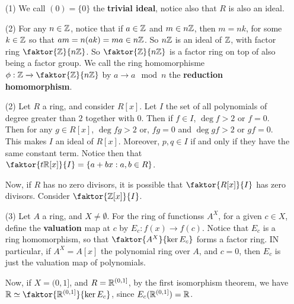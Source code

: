\begin{example}\label{1.10}
    \begin{enumerate}
        \item[(1)] We call $(0)=\{0\}$ the \textbf{trivial ideal}, notice also
            that $R$ is also an ideal.

        \item[(2)] For any $n \in \mathbb{Z}$, notice that if $a \in \mathbb{Z}$ and $m \in
            n\mathbb{Z}$, then  $m=nk$, for some  $k \in \mathbb{Z}$ so that  $am=n(ak)=ma \in
            n\mathbb{Z}$. So $n\mathbb{Z}$ is an ideal of $\mathbb{Z}$, with factor ring
            $\faktor{\Z}{n\Z}$. So $\faktor{\Z}{n\Z}$ is a factor ring on top of
            also being a factor group. We call the ring homomorphisme $\phi:\Z
        \xrightarrow{} \faktor{\Z}{n\Z}$ by $a \xrightarrow{} a \mod{n}$ the
        \textbf{reduction homomorphism}.

        \item[(2)] Let $R$ a ring, and consider  $R[x]$. Let $I$ the set of all
            polynomials of degree greater than $2$ together with $0$. Then if
            $f \in I$,  $\deg{f}>2$ or $f=0$. Then for any  $g \in R[x]$,
            $\deg{fg}>2$ or, $fg=0$ and $\deg{gf}>2$ or $gf=0$. This makes  $I$
            an ideal of $R[x]$. Moreover, $p,q \in I$ if and only if they have
            the same constant term. Notice then that $\faktor{t\R[x]}{I}=\{a+bx
            : a,b \in R\}$.

            Now, if $R$ has no zero divisors, it is possible that
            $\faktor{R[x]}{I}$ has zero divisors. Consider $\faktor{\Z[x]}{I}$.

        \item[(3)] Let $A$ a ring, and  $X \neq \emptyset$. For the ring of
            functionss $A^X$, for a given $c \in X$, define the
            \textbf{valuation} map at $c$ by $E_c:f(x) \xrightarrow{} f(c)$.
            Notice that $E_c$ is a ring homomorphism, so that
            $\faktor{A^X}{\ker{E_c}}$ forms a factor ring. IN particular, if
            $A^X=A[x]$ the polynomial ring over $A$, and  $c=0$, then  $E_c$ is
            just the valuation map of polynomials.

            Now, if  $X=(0,1]$, and $R=\mathbb{R}^{(0,1]}$, by the first isomorphism
            theorem, we have $\R \simeq \faktor{\R^{(0,1]}}{\ker{E_c}}$, since
        $E_c(\mathbb{R}^{(0,1]})=\mathbb{R}$.


\end{enumerate}
\end{example}
